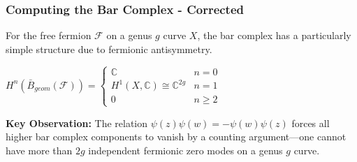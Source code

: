 \subsubsection{Computing the Bar Complex - Corrected}

\begin{theorem}
For the free fermion $\mathcal{F}$ on a genus $g$ curve $X$, the bar complex has a particularly simple structure due to fermionic antisymmetry.


$H^n(\bar{B}_{geom}(\mathcal{F})) = \begin{cases}
\mathbb{C} & n = 0\\
H^1(X, \mathbb{C}) \cong \mathbb{C}^{2g} & n = 1\\
0 & n \geq 2
\end{cases}$
\end{theorem}

\textbf{Key Observation:} The relation $\psi(z)\psi(w) = -\psi(w)\psi(z)$ forces all higher bar complex
components to vanish by a counting argument---one cannot have more than $2g$ independent
fermionic zero modes on a genus $g$ curve.

